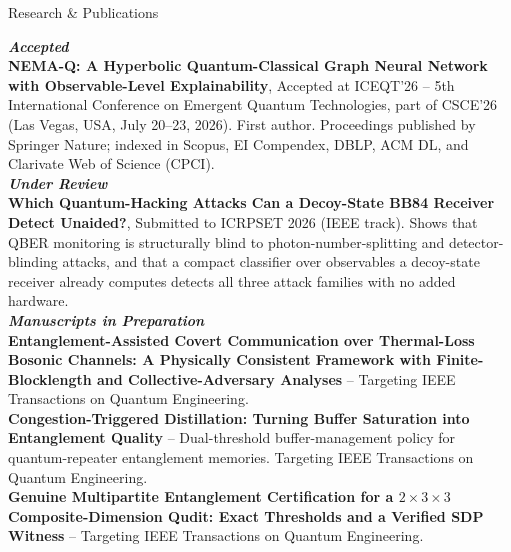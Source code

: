 \documentclass{resume} %
\begin{document}
\begin{rSection}{Research \& Publications} \itemsep -3pt

\textbf{\textit{Accepted}} \vspace{.1cm} \\
{\textbf{NEMA-Q: A Hyperbolic Quantum-Classical Graph Neural Network with Observable-Level Explainability}}, Accepted at ICEQT'26 – 5th International Conference on Emergent Quantum Technologies, part of CSCE'26 (Las Vegas, USA, July 20–23, 2026). First author. Proceedings published by Springer Nature; indexed in Scopus, EI Compendex, DBLP, ACM DL, and Clarivate Web of Science (CPCI).\vspace{.15cm} \\
\textbf{\textit{Under Review}} \vspace{.1cm} \\
{\textbf{Which Quantum-Hacking Attacks Can a Decoy-State BB84 Receiver Detect Unaided?}}, Submitted to ICRPSET 2026 (IEEE track). Shows that QBER monitoring is structurally blind to photon-number-splitting and detector-blinding attacks, and that a compact classifier over observables a decoy-state receiver already computes detects all three attack families with no added hardware.\vspace{.15cm} \\
\textbf{\textit{Manuscripts in Preparation}} \vspace{.1cm} \\
{\textbf{Entanglement-Assisted Covert Communication over Thermal-Loss Bosonic Channels: A Physically Consistent Framework with Finite-Blocklength and Collective-Adversary Analyses}} – Targeting IEEE Transactions on Quantum Engineering.\vspace{.1cm} \\
{\textbf{Congestion-Triggered Distillation: Turning Buffer Saturation into Entanglement Quality}} – Dual-threshold buffer-management policy for quantum-repeater entanglement memories. Targeting IEEE Transactions on Quantum Engineering.\vspace{.1cm} \\
{\textbf{Genuine Multipartite Entanglement Certification for a $2\times3\times3$ Composite-Dimension Qudit: Exact Thresholds and a Verified SDP Witness}} – Targeting IEEE Transactions on Quantum Engineering.\vspace{.1cm} \\

\end{rSection}
\end{document}
